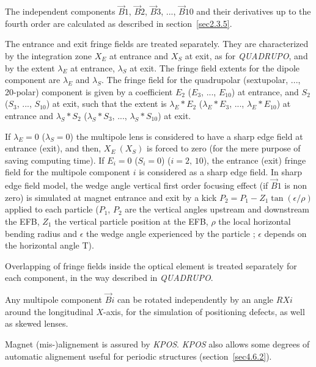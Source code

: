 \noindent The independent components $ \vec  B1$, $\vec  B2$, $\vec  B3$, ..., 
$ \vec  B10 $  and their derivatives up to the fourth order are calculated as described in 
 section~\ref{sec2.3.5}.  

\bigskip

\noindent The entrance and exit fringe fields are treated separately.  They
are characterized by the integration zone $ X_E $ at entrance and $ X_S $ at exit,
as for \textsl{QUADRUPO}, and by the extent $ \lambda_ E $ at entrance, 
$\lambda_ S $ at exit. The fringe field extents for the dipole component are $ \lambda_ E $ 
and $ \lambda_ S $. The fringe field for the quadrupolar 
(sextupolar,  ..., 20-polar) component is given by a coefficient $ E_2 $ 
 ($E_3$, ..., $E_{10}$)  at entrance, and 
$ S_2 $ ($ S_3$, ..., $S_{10}$)  at exit, such that the extent is $ \lambda_ E\ast E_2$
 ($\lambda_ E\ast E_3$, ..., $\lambda_ E\ast E_{10}$)  at 
entrance and $ \lambda_ S\ast S_2 $  ($\lambda_ S\ast S_3$, ..., $\lambda_ S\ast S_{10}$)  
at exit. 
\bigskip

\noindent If $ \lambda_ E=0 $  ($\lambda_ S=0$)  the multipole lens is
considered to have a sharp edge field at entrance (exit), and then, $ X_E \ (X_S) $ is forced to zero 
(for the mere purpose of saving computing time).  If $ E_i=0 $  ($S_i=0$) ($i=2,\, 10$), the entrance (exit) fringe field for 
 the multipole component $ i $ is considered as a sharp edge field.  
In sharp edge field model, the wedge angle vertical first order focusing effect (if $\vec  B1$ is non zero) is simulated at magnet entrance and exit  by a kick $P_2 = P_1 - Z_1 \tan (\epsilon / \rho)$ applied to each particle ($P_1$, $P_2$ are the vertical angles upstream and downstream the EFB, $Z_1$ the vertical particle position at the EFB, $\rho$ the local horizontal bending radius and $\epsilon$ the wedge angle experienced by the particle ; $\epsilon$ depends on the horizontal angle T). 

\bigskip

\noindent Overlapping of fringe fields inside the optical element  is treated separately
for each component, in the way described in \textsl{QUADRUPO}.  
\bigskip

\noindent Any multipole component $ \vec  Bi $ can be rotated independently
by an angle $ RXi $ around the longitudinal $ X$-axis, for the simulation of positioning defects,
as well as skewed lenses. 

\bigskip

\noindent Magnet (mis-)alignement is assured by \textsl{KPOS}. 
\textsl{KPOS} also  allows some degrees of automatic alignement useful for periodic structures (section~\ref{sec4.6.2}).



